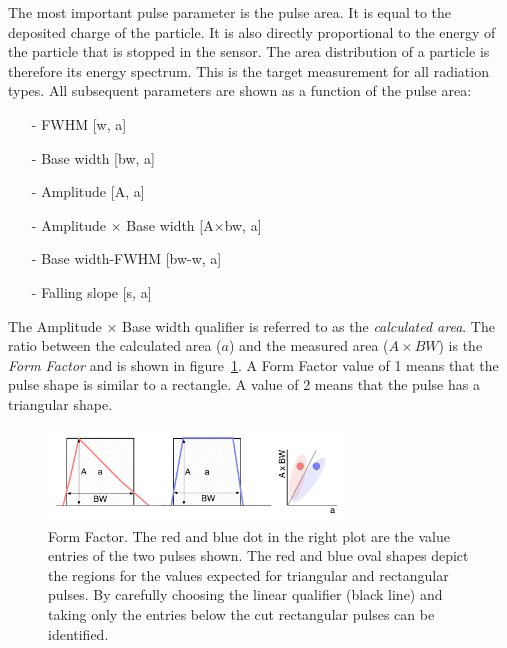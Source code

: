 The most important pulse parameter is the pulse area. It is equal to the deposited charge of the particle. It is also directly proportional to the energy of the particle that is stopped in the sensor. The area distribution of a particle is therefore its energy spectrum. This is the target measurement for all radiation types. All subsequent parameters are shown as a function of the pulse area: 
\begin{itemize}\setlength\itemsep{0.1em}
\item[-] FWHM [w, a]
\item[-] Base width [bw, a]
\item[-] Amplitude [A, a]
\item[-] Amplitude $\times$ Base width [A$\times$bw, a]
\item[-] Base width-FWHM [bw-w, a]
\item[-] Falling slope [s, a]
\end{itemize}
The Amplitude $\times$ Base width qualifier is referred to as the \emph{calculated area}. The ratio between the calculated area ($a$) and the measured area ($A\times BW$) is the \emph{Form Factor} and is shown in figure~\ref{fig:formfac1}. A Form Factor value of 1 means that the pulse shape is similar to a rectangle. A value of 2 means that the pulse has a triangular shape. 



\begin{figure}[!t]
\centering
\includegraphics[width=0.7\textwidth]{05_current_monitoring/plots/formfac1}
\caption{Form Factor. The red and blue dot in the right plot are the value entries of the two pulses shown. The red and blue oval shapes depict the regions for the values expected for triangular and rectangular pulses. By carefully choosing the linear qualifier (black line) and taking only the entries below the cut rectangular pulses can be identified.}
\label{fig:formfac1}
\end{figure}


